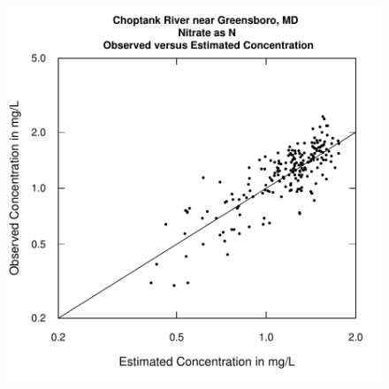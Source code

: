 \documentclass[a4paper,11pt]{article}
\begin{document}
\begin{figure}[htbp]
\begin{minipage}[h]{0.5\linewidth}
\begin{center}
\includegraphics{EGRET-figplotLogConcPred}
    \label{fig:plotLogConcPred}
    \end{center}
  \end{minipage}
  \caption{}
  \label{fig:plotFluxPredANDplotLogConcPred}
\end{figure}

\end{document}

